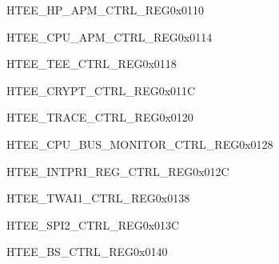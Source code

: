 \begin{register}{H}{TEE\_HP\_APM\_CTRL\_REG}{0x0110}\label{regdesc:TEEHPAPMCTRLREG}
\end{register}\vspace{-3em}

\begin{register}{H}{TEE\_CPU\_APM\_CTRL\_REG}{0x0114}\label{regdesc:TEECPUAPMCTRLREG}
\end{register}\vspace{-3em}

\begin{register}{H}{TEE\_TEE\_CTRL\_REG}{0x0118}\label{regdesc:TEETEECTRLREG}
\end{register}\vspace{-3em}

\begin{register}{H}{TEE\_CRYPT\_CTRL\_REG}{0x011C}\label{regdesc:TEECRYPTCTRLREG}
\end{register}\vspace{-3em}

\begin{register}{H}{TEE\_TRACE\_CTRL\_REG}{0x0120}\label{regdesc:TEETRACECTRLREG}
\end{register}\vspace{-3em}

\begin{register}{H}{TEE\_CPU\_BUS\_MONITOR\_CTRL\_REG}{0x0128}\label{regdesc:TEECPUBUSMONITORCTRLREG}
\end{register}\vspace{-3em}

\begin{register}{H}{TEE\_INTPRI\_REG\_CTRL\_REG}{0x012C}\label{regdesc:TEEINTPRIREGCTRLREG}
\end{register}\vspace{-3em}



\begin{register}{H}{TEE\_TWAI1\_CTRL\_REG}{0x0138}\label{regdesc:TEETWAI1CTRLREG}
\end{register}\vspace{-3em}

\begin{register}{H}{TEE\_SPI2\_CTRL\_REG}{0x013C}\label{regdesc:TEESPI2CTRLREG}
\end{register}\vspace{-3em}

\begin{register}{H}{TEE\_BS\_CTRL\_REG}{0x0140}\label{regdesc:TEEBSCTRLREG}
\end{register}\vspace{-3em}







